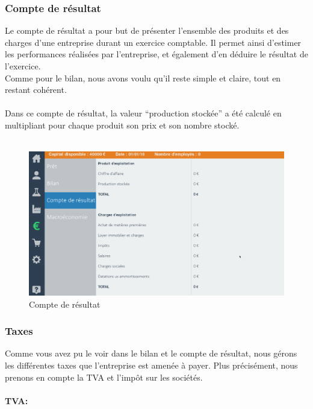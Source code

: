 \subsubsection{Compte de résultat}



Le compte de résultat a pour but de présenter l'ensemble des produits et des charges d'une entreprise durant un exercice comptable. Il permet ainsi d’estimer les performances réalisées par l’entreprise, et également d’en déduire le résultat de l’exercice. \\
Comme pour le bilan, nous avons voulu qu’il reste simple et claire, tout en restant cohérent. \\
\\
Dans ce compte de résultat, la valeur “production stockée” a été calculé en multipliant pour chaque produit son prix et son nombre stocké. \\
\\

\begin{figure}[!htb]
\centering
\includegraphics[scale=0.5]{img/compte.png}
\caption{Compte de résultat}
\end{figure}


\subsubsection{Taxes}



Comme vous avez pu le voir dans le bilan et le compte de résultat, nous gérons les différentes taxes que l’entreprise est amenée à payer. Plus précisément, nous prenons en compte la TVA et l'impôt sur les sociétés.



\paragraph{TVA:}



